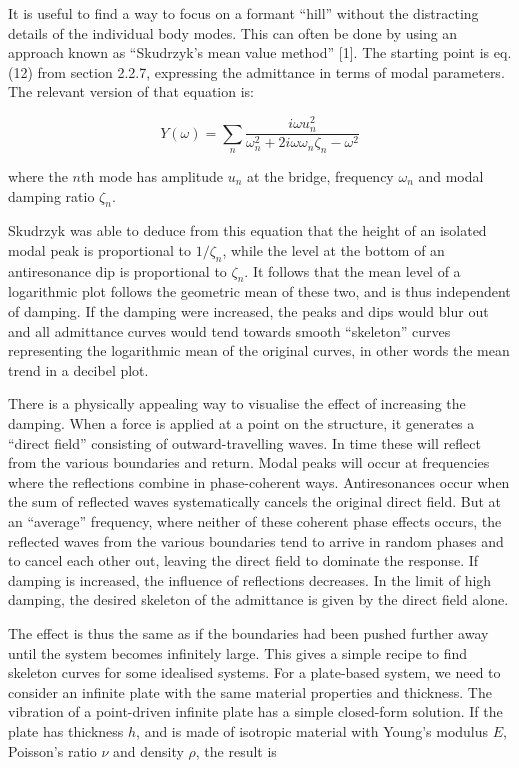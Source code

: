   It is useful to find a way to focus on a formant ``hill'' without the 
  distracting details of the individual body modes. This can often be done by 
  using an approach known as “Skudrzyk’s mean value method” [1]. The starting 
  point is eq. (12) from section 2.2.7, expressing the admittance in terms of 
  modal parameters. The relevant version of that equation is: 

  $$Y(\omega) =\sum_n \dfrac{i \omega u_n^2}{\omega_n^2+2i\omega \omega_n 
  \zeta_n-\omega^2} \tag{1}$$ 

  where the $n$th mode has amplitude $u_n$ at the bridge, frequency $\omega_n$ 
  and modal damping ratio $\zeta_n$. 

  Skudrzyk was able to deduce from this equation that the height of an isolated 
  modal peak is proportional to $1/\zeta_n$, while the level at the bottom of 
  an antiresonance dip is proportional to $\zeta_n$. It follows that the mean 
  level of a logarithmic plot follows the geometric mean of these two, and is 
  thus independent of damping. If the damping were increased, the peaks and 
  dips would blur out and all admittance curves would tend towards smooth 
  “skeleton” curves representing the logarithmic mean of the original curves, 
  in other words the mean trend in a decibel plot. 

  There is a physically appealing way to visualise the effect of increasing the 
  damping. When a force is applied at a point on the structure, it generates a 
  “direct field” consisting of outward-travelling waves. In time these will 
  reflect from the various boundaries and return. Modal peaks will occur at 
  frequencies where the reflections combine in phase-coherent ways. 
  Antiresonances occur when the sum of reflected waves systematically cancels 
  the original direct field. But at an “average” frequency, where neither of 
  these coherent phase effects occurs, the reflected waves from the various 
  boundaries tend to arrive in random phases and to cancel each other out, 
  leaving the direct field to dominate the response. If damping is increased, 
  the influence of reflections decreases. In the limit of high damping, the 
  desired skeleton of the admittance is given by the direct field alone. 

  The effect is thus the same as if the boundaries had been pushed further away 
  until the system becomes infinitely large. This gives a simple recipe to find 
  skeleton curves for some idealised systems. For a plate-based system, we need 
  to consider an infinite plate with the same material properties and 
  thickness. The vibration of a point-driven infinite plate has a simple 
  closed-form solution. If the plate has thickness $h$, and is made of 
  isotropic material with Young's modulus $E$, Poisson's ratio $\nu$ and 
  density $\rho$, the result is 

